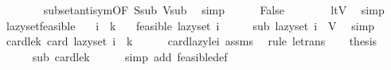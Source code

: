 \begin{isabellebody}
\ \ \ \ \ \ \isamarkupfalse%
\ subset{\isacharunderscore}{\kern0pt}antisym{\isacharbrackleft}{\kern0pt}OF\ S{\isacharunderscore}{\kern0pt}sub\ V{\isacharunderscore}{\kern0pt}sub{\isacharbrackright}{\kern0pt}\ \isamarkupfalse%
\ simp\isanewline
\ \ \ \ \isamarkupfalse%
\ False\isanewline
\ \ \ \ \ \ \isamarkupfalse%
\ ltV\ \isamarkupfalse%
\ simp\isanewline
\ \ \isamarkupfalse%
\isanewline
{}\isamarkupfalse%
%
\endisatagproof
{\isafoldproof}%
%
\isadelimproof
\isanewline
%
\endisadelimproof
\isanewline
{}\isamarkupfalse%
\ lazy{\isacharunderscore}{\kern0pt}set{\isacharunderscore}{\kern0pt}feasible{\isacharcolon}{\kern0pt}\isanewline
\ \ \ {\isachardoublequoteopen}i\ {\isasymle}\ k{\isachardoublequoteclose}\isanewline
\ \ \ {\isachardoublequoteopen}feasible\ {\isacharparenleft}{\kern0pt}lazy{\isacharunderscore}{\kern0pt}set\ i{\isacharparenright}{\kern0pt}{\isachardoublequoteclose}\isanewline
%
\isadelimproof
%
\endisadelimproof
%
\isatagproof
{}\isamarkupfalse%
\ {\isacharminus}{\kern0pt}\isanewline
\ \ \isamarkupfalse%
\ sub{\isacharcolon}{\kern0pt}\ {\isachardoublequoteopen}lazy{\isacharunderscore}{\kern0pt}set\ i\ {\isasymsubseteq}\ V{\isachardoublequoteclose}\ \isamarkupfalse%
\ simp\isanewline
\ \ \isamarkupfalse%
\ card{\isacharunderscore}{\kern0pt}le{\isacharunderscore}{\kern0pt}k{\isacharcolon}{\kern0pt}\ {\isachardoublequoteopen}card\ {\isacharparenleft}{\kern0pt}lazy{\isacharunderscore}{\kern0pt}set\ i{\isacharparenright}{\kern0pt}\ {\isasymle}\ k{\isachardoublequoteclose}\isanewline
\ \ \ \ \isamarkupfalse%
\ card{\isacharunderscore}{\kern0pt}lazy{\isacharunderscore}{\kern0pt}le{\isacharunderscore}{\kern0pt}i\ assms\ \isamarkupfalse%
\ {\isacharparenleft}{\kern0pt}rule\ le{\isacharunderscore}{\kern0pt}trans{\isacharparenright}{\kern0pt}\isanewline
\ \ \isamarkupfalse%
\ {\isacharquery}{\kern0pt}thesis\isanewline
\ \ \ \ \isamarkupfalse%
\ sub\ card{\isacharunderscore}{\kern0pt}le{\isacharunderscore}{\kern0pt}k\isanewline
\ \ \ \ \isamarkupfalse%
\ {\isacharparenleft}{\kern0pt}simp\ add{\isacharcolon}{\kern0pt}\ feasible{\isacharunderscore}{\kern0pt}def{\isacharparenright}{\kern0pt}\isanewline
{}\isamarkupfalse%
%
\endisatagproof
{\isafoldproof}%
%
\isadelimproof

\end{isabellebody}
